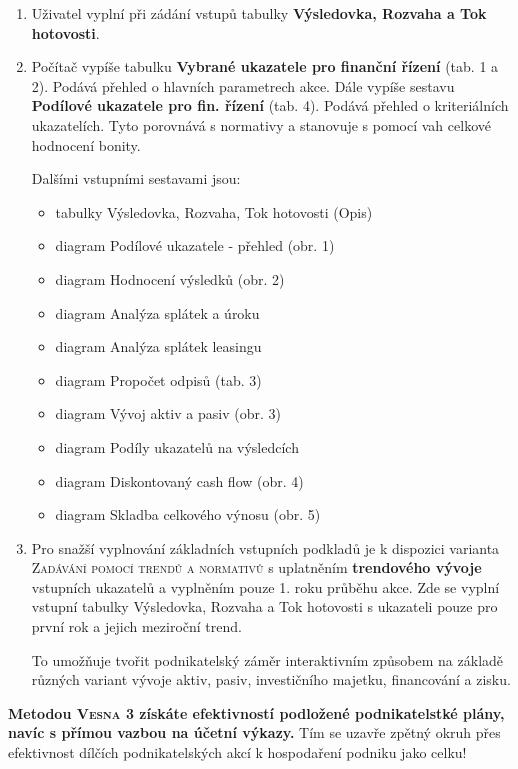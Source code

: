 \documentclass [10pt, fancyhdr, twoside] {article}
\begin{document}
\begin{enumerate}
\item Uživatel vyplní při zádání vstupů tabulky \textbf{Výsledovka, Rozvaha a Tok hotovosti}.
\item Počítač vypíše tabulku \textbf{Vybrané ukazatele pro finanční řízení} (tab. 1 a 2). Podává přehled o hlavních parametrech akce. Dále vypíše sestavu \textbf{Podílové ukazatele pro fin. řízení} (tab. 4). Podává přehled o kriteriálních ukazatelích. Tyto porovnává s normativy a stanovuje s pomocí vah celkové hodnocení bonity.

\pagebreak

Dalšími vstupními sestavami jsou:

\begin{itemize}
\item tabulky Výsledovka, Rozvaha, Tok hotovosti (Opis)
\item diagram Podílové ukazatele - přehled (obr. 1)
\item diagram Hodnocení výsledků (obr. 2)
\item diagram Analýza splátek a úroku
\item diagram Analýza splátek leasingu
\item diagram Propočet odpisů (tab. 3)
\item diagram Vývoj aktiv a pasiv (obr. 3)
\item diagram Podíly ukazatelů na výsledcích
\item diagram Diskontovaný cash flow (obr. 4)
\item diagram Skladba celkového výnosu (obr. 5)
\end{itemize}

\item Pro snažší vyplnování základních vstupních podkladů je k dispozici varianta \textsc{Zadávání pomocí trendů a normativů} s uplatněním \textbf{trendového vývoje} vstupních ukazatelů a vyplněním pouze 1. roku průběhu akce. Zde se vyplní vstupní tabulky Výsledovka, Rozvaha a Tok hotovosti s ukazateli pouze pro první rok a jejich meziroční trend.

To umožňuje tvořit podnikatelský záměr interaktivním způsobem na základě různých variant vývoje aktiv, pasiv, investičního majetku, financování a zisku.

\end{enumerate}


\begin{tcolorbox}
\textbf{Metodou \textsc{Vesna} 3 získáte efektivností podložené podnikatelstké plány, navíc s přímou vazbou na účetní výkazy.} Tím se uzavře zpětný okruh přes efektivnost dílčích podnikatelských akcí k hospodaření podniku jako celku!
\end{tcolorbox}
\end{document}

